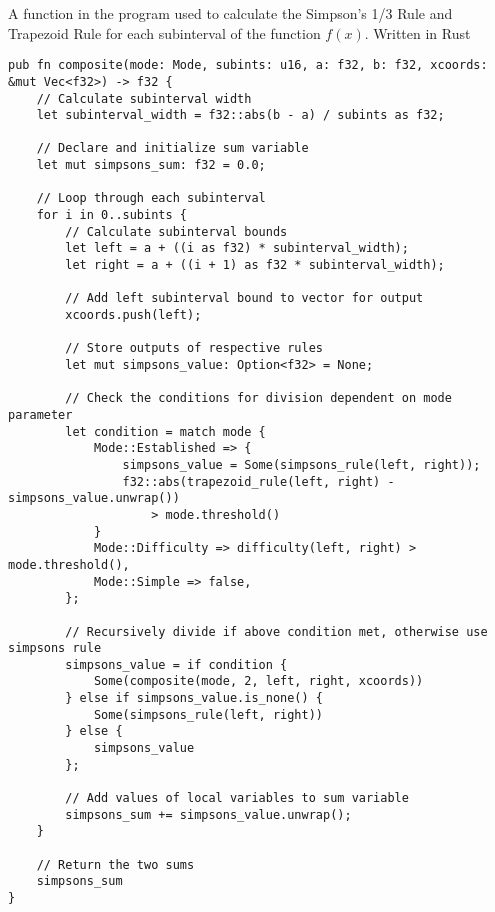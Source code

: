 \documentclass[../IA.tex]{subfiles}
\begin{document}
\begin{listing}[ht]
\centering
{}
\caption{A function in the program used to calculate the Simpson's 1/3 Rule and Trapezoid Rule for each subinterval of the function \(f(x)\). Written in Rust}
\label{lst:rust_composite}
\begin{verbatim}
pub fn composite(mode: Mode, subints: u16, a: f32, b: f32, xcoords: &mut Vec<f32>) -> f32 {
    // Calculate subinterval width
    let subinterval_width = f32::abs(b - a) / subints as f32;

    // Declare and initialize sum variable
    let mut simpsons_sum: f32 = 0.0;

    // Loop through each subinterval
    for i in 0..subints {
        // Calculate subinterval bounds
        let left = a + ((i as f32) * subinterval_width);
        let right = a + ((i + 1) as f32 * subinterval_width);

        // Add left subinterval bound to vector for output
        xcoords.push(left);

        // Store outputs of respective rules
        let mut simpsons_value: Option<f32> = None;

        // Check the conditions for division dependent on mode parameter
        let condition = match mode {
            Mode::Established => {
                simpsons_value = Some(simpsons_rule(left, right));
                f32::abs(trapezoid_rule(left, right) - simpsons_value.unwrap())
                    > mode.threshold()
            }
            Mode::Difficulty => difficulty(left, right) > mode.threshold(),
            Mode::Simple => false,
        };

        // Recursively divide if above condition met, otherwise use simpsons rule
        simpsons_value = if condition {
            Some(composite(mode, 2, left, right, xcoords))
        } else if simpsons_value.is_none() {
            Some(simpsons_rule(left, right))
        } else {
            simpsons_value
        };

        // Add values of local variables to sum variable
        simpsons_sum += simpsons_value.unwrap();
    }

    // Return the two sums
    simpsons_sum
}
\end{verbatim}
\end{listing}
\end{document}
